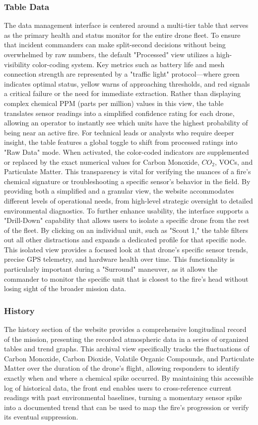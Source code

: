 \documentclass[journal, onecolumn]{IEEEtran}
\begin{document}
\subsubsection{Table Data}
The data management interface is centered around a multi-tier table that serves as the primary health and status monitor for the entire drone fleet. To ensure that incident commanders can make split-second decisions without being overwhelmed by raw numbers, the default "Processed" view utilizes a high-visibility color-coding system. Key metrics such as battery life and mesh connection strength are represented by a "traffic light" protocol—where green indicates optimal status, yellow warns of approaching thresholds, and red signals a critical failure or the need for immediate extraction. Rather than displaying complex chemical PPM (parts per million) values in this view, the table translates sensor readings into a simplified confidence rating for each drone, allowing an operator to instantly see which units have the highest probability of being near an active fire.
For technical leads or analysts who require deeper insight, the table features a global toggle to shift from processed ratings into "Raw Data" mode. When activated, the color-coded indicators are supplemented or replaced by the exact numerical values for Carbon Monoxide, $CO_2$, VOCs, and Particulate Matter. This transparency is vital for verifying the nuances of a fire's chemical signature or troubleshooting a specific sensor's behavior in the field. By providing both a simplified and a granular view, the website accommodates different levels of operational needs, from high-level strategic oversight to detailed environmental diagnostics.
To further enhance usability, the interface supports a "Drill-Down" capability that allows users to isolate a specific drone from the rest of the fleet. By clicking on an individual unit, such as "Scout 1," the table filters out all other distractions and expands a dedicated profile for that specific node. This isolated view provides a focused look at that drone’s specific sensor trends, precise GPS telemetry, and hardware health over time. This functionality is particularly important during a "Surround" maneuver, as it allows the commander to monitor the specific unit that is closest to the fire's head without losing sight of the broader mission data.

\subsubsection{History}
The history section of the website provides a comprehensive longitudinal record of the mission, presenting the recorded atmospheric data in a series of organized tables and trend graphs. This archival view specifically tracks the fluctuations of Carbon Monoxide, Carbon Dioxide, Volatile Organic Compounds, and Particulate Matter over the duration of the drone's flight, allowing responders to identify exactly when and where a chemical spike occurred. By maintaining this accessible log of historical data, the front end enables users to cross-reference current readings with past environmental baselines, turning a momentary sensor spike into a documented trend that can be used to map the fire's progression or verify its eventual suppression.
\end{document}
